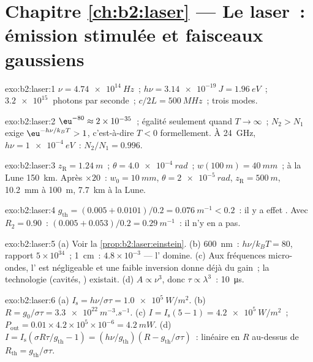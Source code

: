 \section*{Chapitre \ref{ch:b2:laser} --- Le laser~: émission stimulée et faisceaux gaussiens}

\begin{solution}{exo:b2:laser:1}
$\nu = \qty{4.74e14}{Hz}$~; $h\nu = \qty{3.14e-19}{J} = \qty{1.96}{eV}$~;
$\qty{3.2e15}{}$ photons par seconde~; $c/2L = \qty{500}{MHz}$~; trois
modes.
\end{solution}

\begin{solution}{exo:b2:laser:2}
$\eu^{-80} \approx 2 \times 10^{-35}$~; égalité seulement quand $T \to \infty$~;
$N_2 > N_1$ exige $\eu^{-h\nu/k_BT} > 1$, c'est-à-dire $T < 0$ formellement. À
\qty{24}{GHz}, $h\nu = \qty{1e-4}{eV}$~: $N_2/N_1 = 0.996$.
\end{solution}

\begin{solution}{exo:b2:laser:3}
$z_{\text{R}} = \qty{1.24}{m}$~; $\theta = \qty{4.0e-4}{rad}$~; $w(\qty{100}{m}) =
\qty{40}{mm}$~; à la Lune \qty{150}{km}. Après $\times 20$~: $w_0 = \qty{10}{mm}$,
$\theta = \qty{2e-5}{rad}$, $z_{\text{R}} = \qty{500}{m}$, \qty{10.2}{mm} à
\qty{100}{m}, \qty{7.7}{km} à la Lune.
\end{solution}

\begin{solution}{exo:b2:laser:4}
$g_{\text{th}} = (0.005 + 0.0101)/0.2 = \qty{0.076}{m^{-1}} < 0.2$~: il y a
effet . Avec $R_2 = 0.90$~: $(0.005 + 0.053)/0.2 = \qty{0.29}{m^{-1}}$~: il n'y
en a pas.
\end{solution}

\begin{solution}{exo:b2:laser:5}
(a) Voir la \cref{prop:b2:laser:einstein}. (b) \qty{600}{nm}~: $h\nu/k_BT
= 80$, rapport $5 \times 10^{34}$~; \qty{1}{cm}~: $4.8 \times 10^{-3}$ ---
l' domine. (c) Aux fréquences micro-ondes,
l' est négligeable et une faible inversion donne déjà du
gain~; la technologie (cavités, ) existait. (d) $A \propto
\nu^3$, donc $\tau \propto \lambda^3$~: \qty{10}{\micro s}.
\end{solution}

\begin{solution}{exo:b2:laser:6}
(a) $I_{\text{s}} = h\nu/\sigma\tau = \qty{1.0e5}{W/m^2}$. (b) $R =
g_0/\sigma\tau = \qty{3.3e22}{m^{-3}.s^{-1}}$. (c) $I = I_{\text{s}}(5 - 1) =
\qty{4.2e5}{W/m^2}$~; $P_{\text{out}} = 0.01 \times 4.2 \times 10^5 \times
10^{-6} = \qty{4.2}{mW}$. (d) $I = I_{\text{s}}(\sigma R\tau/g_{\text{th}}
- 1) = (h\nu/g_{\text{th}})(R - g_{\text{th}}/\sigma\tau)$~: linéaire en $R$
au-dessus de $R_{\text{th}} = g_{\text{th}}/\sigma\tau$.
\end{solution}

